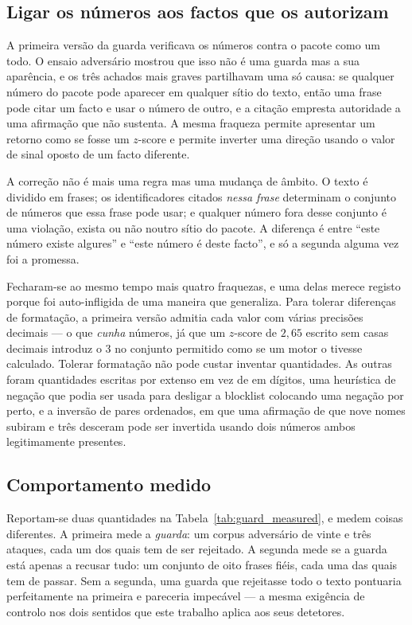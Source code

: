 \subsection{Ligar os números aos factos que os autorizam}

A primeira versão da guarda verificava os números contra o pacote como um todo. O ensaio adversário
mostrou que isso não é uma guarda mas a sua aparência, e os três achados mais graves partilhavam uma
só causa: se qualquer número do pacote pode aparecer em qualquer sítio do texto, então uma frase pode
citar um facto e usar o número de outro, e a citação empresta autoridade a uma afirmação que não
sustenta. A mesma fraqueza permite apresentar um retorno como se fosse um $z$-score e permite
inverter uma direção usando o valor de sinal oposto de um facto diferente.

A correção não é mais uma regra mas uma mudança de âmbito. O texto é dividido em frases; os
identificadores citados \emph{nessa frase} determinam o conjunto de números que essa frase pode usar;
e qualquer número fora desse conjunto é uma violação, exista ou não noutro sítio do pacote. A
diferença é entre ``este número existe algures'' e ``este número é deste facto'', e só a segunda
alguma vez foi a promessa.

Fecharam-se ao mesmo tempo mais quatro fraquezas, e uma delas merece registo porque foi auto-infligida
de uma maneira que generaliza. Para tolerar diferenças de formatação, a primeira versão admitia cada
valor com várias precisões decimais --- o que \emph{cunha} números, já que um $z$-score de $2,65$
escrito sem casas decimais introduz o $3$ no conjunto permitido como se um motor o tivesse calculado.
Tolerar formatação não pode custar inventar quantidades. As outras foram quantidades escritas por
extenso em vez de em dígitos, uma heurística de negação que podia ser usada para desligar a blocklist
colocando uma negação por perto, e a inversão de pares ordenados, em que uma afirmação de que nove
nomes subiram e três desceram pode ser invertida usando dois números ambos legitimamente presentes.

\subsection{Comportamento medido}

Reportam-se duas quantidades na Tabela~\ref{tab:guard_measured}, e medem coisas diferentes. A
primeira mede a \emph{guarda}: um corpus
adversário de vinte e três ataques, cada um dos quais tem de ser rejeitado. A segunda mede se a
guarda está apenas a recusar tudo: um conjunto de oito frases fiéis, cada uma das quais tem de
passar. Sem a segunda, uma guarda que rejeitasse todo o texto pontuaria perfeitamente na primeira e
pareceria impecável --- a mesma exigência de controlo nos dois sentidos que este trabalho aplica aos
seus detetores.

